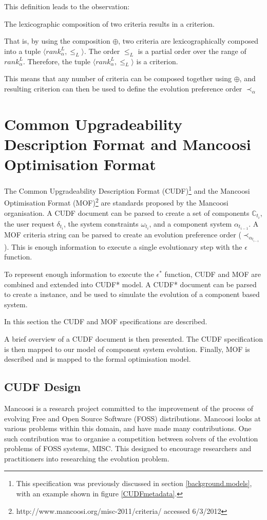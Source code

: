 This definition leads to the observation:
\begin{obs}
The lexicographic composition of two criteria results in a criterion.
\end{obs}
That is, by using the composition $\oplus$, two criteria are lexicographically composed into a tuple $\langle rank^L_{\alpha},\leq_L \rangle$.
The order $\leq_L$ is a partial order over the range of $rank^L_{\alpha}$.
Therefore, the tuple  $\langle rank^L_{\alpha},\leq_L \rangle$ is a criterion.

This means that any number of criteria can be composed together using $\oplus$,
and resulting criterion can then be used to define the evolution preference order $\prec_{\alpha}$


\section{Common Upgradeability Description Format and Mancoosi Optimisation Format}
\label{formal.cudf}
The Common Upgradeability Description Format (CUDF)\footnote{This specification was previously discussed in section \ref{background.models}, with an example shown in figure \ref{CUDFmetadata}.
}
\citep{treinen2009common} and the Mancoosi Optimisation Format (MOF)\footnote{http://www.mancoosi.org/misc-2011/criteria/ accessed 6/3/2012}
are standards proposed by the Mancoosi organisation.
A CUDF document can be parsed to create a set of components $\mathbb{C}_{t_i}$, the user request $\delta_{t_i}$, the system constraints $\omega_{t_i}$,
and a component system $\alpha_{t_{i-1}}$.
A MOF criteria string can be parsed to create an evolution preference order ($\prec_{\alpha_{t_{i-1}}}$).
This is enough information to execute a single evolutionary step with the $\epsilon$ function.

To represent enough information to execute the $\epsilon^*$ function,
CUDF and MOF are combined and extended into CUDF* model.
A CUDF* document can be parsed to create a \modelname instance, and be used to simulate the evolution of a component based system.

In this section the CUDF and MOF specifications are described.

A brief overview of a CUDF document is then presented.
The CUDF specification is then mapped to our model of component system evolution.
Finally, MOF is described and is mapped to the formal optimisation model.

\subsection{CUDF Design}
\label{formal.cudfDesign}
Mancoosi is a research project committed to the improvement of the process of evolving Free and Open Source Software (FOSS) distributions.
Mancoosi looks at various problems within this domain, and have made many contributions.
One such contribution was to organise a competition between solvers of the evolution problems of FOSS systems, MISC.
This designed to encourage researchers and practitioners into researching the evolution problem.

